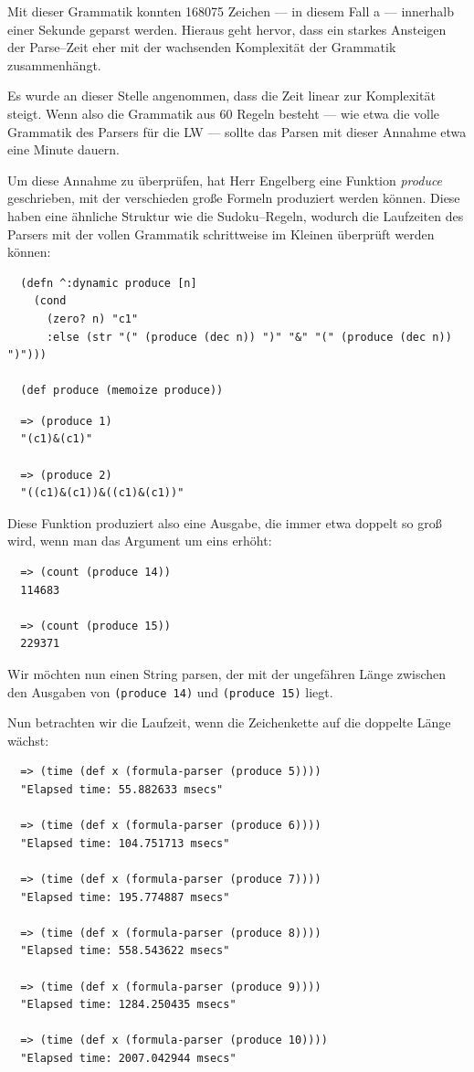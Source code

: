 \documentclass[ngerman,a4paper,abstracton,open=right,twoside=false,toc=listofnumbered,bibtotocnumbered]{scrreprt}
\begin{document}
Mit dieser Grammatik konnten 168075 Zeichen --- in diesem Fall \glqq{}a\grqq{} --- innerhalb einer Sekunde geparst werden. Hieraus geht hervor, dass ein starkes Ansteigen der Parse--Zeit eher mit der wachsenden Komplexität der Grammatik zusammenhängt.

Es wurde an dieser Stelle angenommen, dass die Zeit linear zur Komplexität steigt. Wenn also die Grammatik aus 60 Regeln besteht --- wie etwa die volle Grammatik des Parsers für die LW --- sollte das Parsen mit dieser Annahme etwa eine Minute dauern.

Um diese Annahme zu überprüfen, hat Herr Engelberg eine Funktion \emph{produce} geschrieben, mit der verschieden große Formeln produziert werden können. Diese haben eine ähnliche Struktur wie die Sudoku--Regeln, wodurch die Laufzeiten des Parsers mit der vollen Grammatik schrittweise im Kleinen überprüft werden können:

\begin{lstlisting}
  (defn ^:dynamic produce [n]
    (cond
      (zero? n) "c1"
      :else (str "(" (produce (dec n)) ")" "&" "(" (produce (dec n)) ")")))

  (def produce (memoize produce))
\end{lstlisting}

\begin{lstlisting}
  => (produce 1)
  "(c1)&(c1)"

  => (produce 2)
  "((c1)&(c1))&((c1)&(c1))"
\end{lstlisting}

Diese Funktion produziert also eine Ausgabe, die immer etwa doppelt so groß wird, wenn man das Argument um eins erhöht:

\begin{lstlisting}
  => (count (produce 14))
  114683

  => (count (produce 15))
  229371
\end{lstlisting}

Wir möchten nun einen String parsen, der mit der ungefähren Länge zwischen den Ausgaben von \lstinline|(produce 14)| und \lstinline|(produce 15)| liegt.

Nun betrachten wir die Laufzeit, wenn die Zeichenkette auf die doppelte Länge wächst:

\begin{lstlisting}
  => (time (def x (formula-parser (produce 5))))
  "Elapsed time: 55.882633 msecs"

  => (time (def x (formula-parser (produce 6))))
  "Elapsed time: 104.751713 msecs"

  => (time (def x (formula-parser (produce 7))))
  "Elapsed time: 195.774887 msecs"

  => (time (def x (formula-parser (produce 8))))
  "Elapsed time: 558.543622 msecs"

  => (time (def x (formula-parser (produce 9))))
  "Elapsed time: 1284.250435 msecs"

  => (time (def x (formula-parser (produce 10))))
  "Elapsed time: 2007.042944 msecs"
\end{lstlisting}
\end{document}

